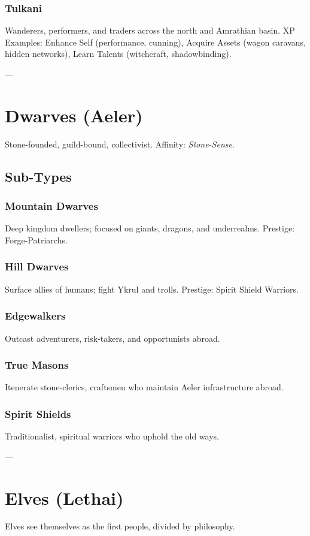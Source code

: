 \documentclass[11pt]{book}
\begin{document}
\subsubsection{Tulkani}
Wanderers, performers, and traders across the north and Amrathian basin.  
XP Examples: Enhance Self (performance, cunning), Acquire Assets (wagon caravans, hidden networks), Learn Talents (witchcraft, shadowbinding).  

---

\section{Dwarves (Aeler)}
Stone-founded, guild-bound, collectivist.  
Affinity: \emph{Stone-Sense}.  

\subsection{Sub-Types}
\subsubsection{Mountain Dwarves}
Deep kingdom dwellers; focused on giants, dragons, and underrealms. Prestige: Forge-Patriarchs.  

\subsubsection{Hill Dwarves}
Surface allies of humans; fight Ykrul and trolls. Prestige: Spirit Shield Warriors.  

\subsubsection{Edgewalkers}
Outcast adventurers, risk-takers, and opportunists abroad. 

\subsubsection{True Masons}
Itenerate stone-clerics, craftsmen who maintain Aeler infrastructure abroad.

\subsubsection{Spirit Shields}
Traditionalist, spiritual warriors who uphold the old ways.

---

\section{Elves (Lethai)}
Elves see themselves as the first people, divided by philosophy.  
\end{document}
